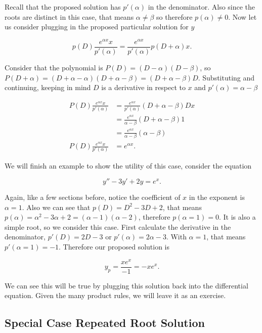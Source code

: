 \documentclass[12pt]{article}
\begin{document}
Recall that the proposed solution has $p'(\alpha)$ in the denominator. Also since the roots are distinct in this case, that means $\alpha \neq \beta$ so therefore $p(\alpha) \neq 0$. Now let us consider plugging in the proposed particular solution for $y$

\begin{equation*}
    p(D)\frac{e^{\alpha x}x}{p'(\alpha)} = \frac{e^{\alpha x}}{p'(\alpha)}p(D+\alpha)x.
\end{equation*}

Consider that the polynomial is $P(D)=(D-\alpha)(D-\beta)$, so $P(D+\alpha)=(D+\alpha-\alpha)(D+\alpha-\beta)=(D+\alpha-\beta)D$. Substituting and continuing, keeping in mind $D$ is a derivative in respect to $x$ and $p'(\alpha)=\alpha-\beta$

\begin{align*}
    P(D)\frac{e^{\alpha x}x}{p'(\alpha)} &= \frac{e^{\alpha x}}{p'(\alpha)}(D+\alpha-\beta)Dx \\
     &= \frac{e^{\alpha x}}{\alpha-\beta}(D+\alpha-\beta)1 \\
     &= \frac{e^{\alpha x}}{\alpha-\beta}(\alpha-\beta) \\
    P(D)\frac{e^{\alpha x}x}{p'(\alpha)} &= e^{\alpha x}.
\end{align*}

We will finish an example to show the utility of this case, consider the equation

\begin{equation*}
    y''-3y'+2y=e^x.
\end{equation*}

Again, like a few sections before, notice the coefficient of $x$ in the exponent is $\alpha=1$. Also we can see that $p(D)=D^2-3D+2$, that means $p(\alpha)=\alpha^2-3\alpha+2=(\alpha-1)(\alpha-2)$, therefore $p(\alpha=1)=0$. It is also a simple root, so we consider this case. First calculate the derivative in the denominator, $p'(D)=2D-3$ or $p'(\alpha)=2\alpha-3$. With $\alpha=1$, that means $p'(\alpha=1)=-1$. Therefore our proposed solution is

\begin{equation*}
    y_p=\frac{xe^x}{-1}=-xe^x.
\end{equation*}

We can see this will be true by plugging this solution back into the differential equation. Given the many product rules, we will leave it as an exercise.

\subsection{Special Case Repeated Root Solution}
\end{document}
